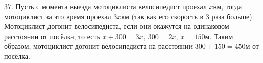 37. Пусть с момента выезда мотоциклиста велосипедист проехал $x$км, тогда мотоциклист за это время проехал $3x$км (так как его скорость в 3 раза больше). Мотоциклист догонит велосипедиста, если они окажутся на одинаковом расстоянии от посёлка, то есть $x+300=3x,\ 300=2x,\ x=150$м. Таким образом, мотоциклист догонит велосипедиста на расстоянии $300+150=450$м от посёлка.\\
